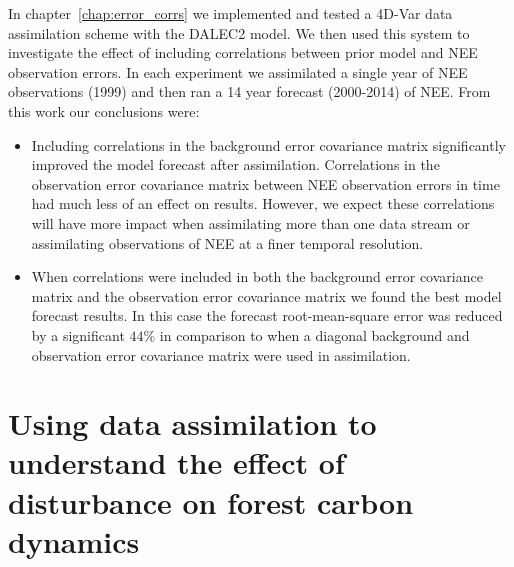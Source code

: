 In chapter~\ref{chap:error_corrs} we implemented and tested a 4D-Var data assimilation scheme with the DALEC2 model. We then used this system to investigate the effect of including correlations between prior model and NEE observation errors. In each experiment we assimilated a single year of NEE observations (1999) and then ran a 14 year forecast (2000-2014) of NEE. From this work our conclusions were:
\begin{itemize}
\item Including correlations in the background error covariance matrix significantly improved the model forecast after assimilation. Correlations in the observation error covariance matrix between NEE observation errors in time had much less of an effect on results. However, we expect these correlations will have more impact when assimilating more than one data stream or assimilating observations of NEE at a finer temporal resolution.
\item When correlations were included in both the background error covariance matrix and the observation error covariance matrix we found the best model forecast results. In this case the forecast root-mean-square error was reduced by a significant $44\% $ in comparison to when a diagonal background and observation error covariance matrix were used in assimilation.
\end{itemize} 


\section{Using data assimilation to understand the effect of disturbance on forest carbon dynamics}

